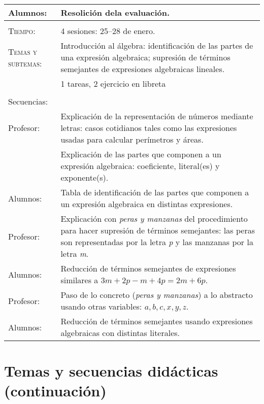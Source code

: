 \documentclass[letterpaper,10pt]{article}
\begin{document}
\begin{tabular}[t]{R{0.25\textwidth}p{0.71\textwidth}}
    Alumnos:     & Resolici\'on dela evaluaci\'on. \\
\hline\\

    \textsc{Tiempo:}          & 4 sesiones: 25--28  de enero. \\
    \textsc{Temas y subtemas:}& Introducci\'on al \'algebra:
    identificaci\'on de las partes de una expresi\'on algebraica; supresi\'on de
    t\'erminos semejantes de expresiones algebraicas lineales.\\    
    & 1 tareas, 2 ejercicio en libreta\\ \\
    \large{\sc Secuencias:} \\
    Profesor:   & Explicaci\'on de la representaci\'on de n\'umeros mediante
    letras: casos cotidianos tales como las expresiones usadas para calcular
    per\'imetros y \'areas. \\ & Explicaci\'on de las partes que componen a un
    expresi\'on algebraica: coeficiente, literal(es) y exponente(s). \\    

    Alumnos:     & Tabla de identificaci\'on de las partes que componen a un
    expresi\'on algebraica en distintas expresiones. \\    
    
    Profesor:   & Explicaci\'on con \emph{peras y manzanas} del procedimiento
    para hacer supresi\'on de t\'erminos semejantes: las peras son representadas
    por la letra \emph{p} y las manzanas por la letra \emph{m}. \\    
    
    Alumnos:     & Reducci\'on de t\'erminos semejantes de expresiones similares
    a $3m+2p-m+4p=2m+6p$. \\    
    
    Profesor:   & Paso de lo concreto (\emph{peras y manzanas}) a lo abstracto
    usando otras variables: $a,b,c,x,y,z$. \\    
    
    Alumnos:     & Reducci\'on de t\'erminos semejantes usando expresiones
    algebraicas con distintas literales.
\end{tabular}

\newpage
\section{Temas  y secuencias did\'acticas (continuaci\'on)}
\end{document}
